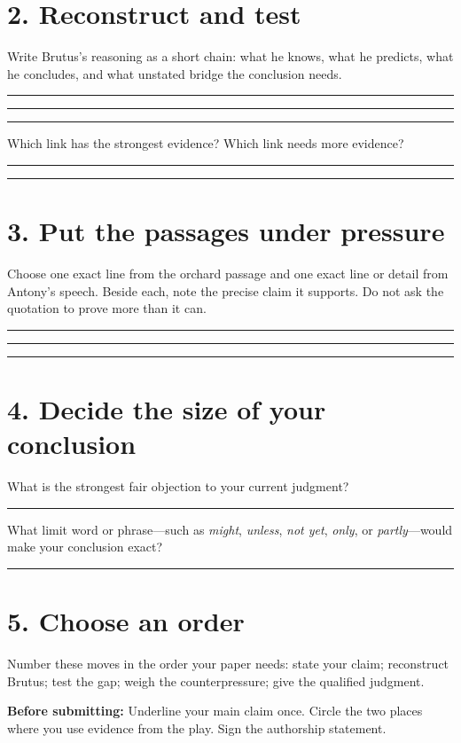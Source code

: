 \documentclass[11pt]{article}
\newcommand{\blankline}{\par\vspace{0.12em}\noindent\rule{\linewidth}{0.4pt}\par\vspace{0.38em}}
\begin{document}
\section*{2. Reconstruct and test}
Write Brutus's reasoning as a short chain: what he knows, what he predicts, what he concludes, and what unstated bridge the conclusion needs.
\blankline
\blankline
\blankline

Which link has the strongest evidence? Which link needs more evidence?
\blankline
\blankline

\section*{3. Put the passages under pressure}
Choose one exact line from the orchard passage and one exact line or detail from Antony's speech. Beside each, note the precise claim it supports. Do not ask the quotation to prove more than it can.
\blankline
\blankline
\blankline

\section*{4. Decide the size of your conclusion}
What is the strongest fair objection to your current judgment?
\blankline
What limit word or phrase---such as \emph{might}, \emph{unless}, \emph{not yet}, \emph{only}, or \emph{partly}---would make your conclusion exact?
\blankline

\section*{5. Choose an order}
Number these moves in the order your paper needs: state your claim; reconstruct Brutus; test the gap; weigh the counterpressure; give the qualified judgment.

\vfill
\textbf{Before submitting:} Underline your main claim once. Circle the two places where you use evidence from the play. Sign the authorship statement.
\end{document}
